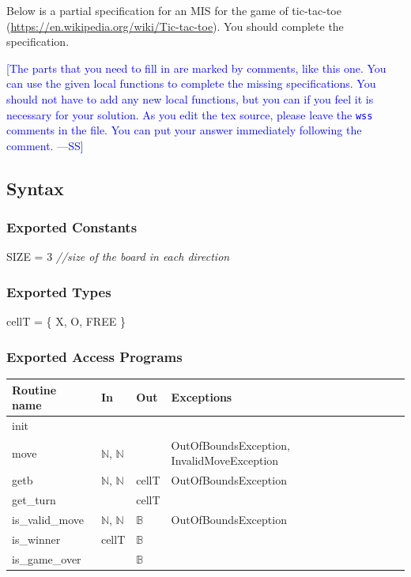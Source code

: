\documentclass[12pt,fleqn]{examtst}
\newcommand{\authornote}[3]{\textcolor{#1}{[#3 ---#2]}}
\newcommand{\authornote}[3]{}
\newcommand{\wss}[1]{\authornote{blue}{SS}{#1}}
\begin{document}
 Below is a partial specification for an MIS for the game of
tic-tac-toe (\url{https://en.wikipedia.org/wiki/Tic-tac-toe}).  You should
complete the specification.

\bigskip

\wss{The parts that you need to fill in are marked by comments, like this one.
  You can use the given local functions to complete the missing specifications.
  You should not have to add any new local functions, but you can if you feel it
  is necessary for your solution.  As you edit the tex source, please leave the
  \texttt{wss} comments in the file.  You can put your answer immediately
  following the comment.}

\subsection* {Syntax}

\subsubsection* {Exported Constants}

SIZE = 3 {\it //size of the board in each direction}\\

\subsubsection* {Exported Types}

cellT = \{ X, O, FREE \} \\

\subsubsection* {Exported Access Programs}

\begin{tabular}{| l | l | l | p{7cm} |}
\hline
\textbf{Routine name} & \textbf{In} & \textbf{Out} & \textbf{Exceptions}\\
\hline
init & ~ & ~ & ~\\
\hline
move & $\mathbb{N}$, $\mathbb{N}$ & ~ & OutOfBoundsException, InvalidMoveException\\
\hline
getb & $\mathbb{N}$, $\mathbb{N}$ & cellT & OutOfBoundsException\\
\hline
get\_turn & ~ & cellT & ~\\
\hline
is\_valid\_move & $\mathbb{N}$, $\mathbb{N}$ & $\mathbb{B}$ & OutOfBoundsException\\
\hline
is\_winner & cellT & $\mathbb{B}$ & ~\\
\hline
is\_game\_over & ~ & $\mathbb{B}$ & ~\\
\hline

\end{tabular}
\end{document}

